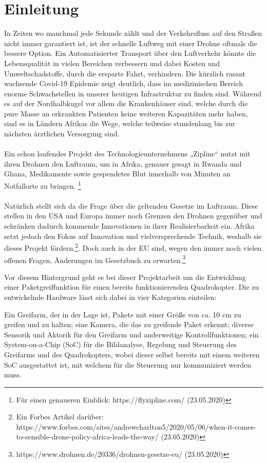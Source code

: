 \chapter{Einleitung}
In Zeiten wo manchmal jede Sekunde zählt und der Verkehrsfluss auf den Straßen nicht immer garantiert ist, ist der schnelle Luftweg mit einer Drohne oftmals die bessere Option. Ein Automatisierter Transport über den Luftverkehr könnte die Lebensqualität in vielen Bereichen verbessern und dabei Kosten und Umweltschadstoffe, durch die ersparte Fahrt, verhindern. Die kürzlich rasant wachsende Covid-19 Epidemie zeigt deutlich, dass im medizinischen Bereich enorme Schwachstellen in unserer heutigen Infrastruktur zu finden sind. Während es auf der Nordhalbkugel vor allem die Krankenhäuser sind, welche durch die pure Masse an erkrankten Patienten keine weiteren Kapazitäten mehr haben, sind es in Ländern Afrikas die Wege, welche teilweise stundenlang bis zur nächsten ärztlichen Versorgung sind.\\
\\
Ein schon laufendes Projekt des Technologieunternehmens „Zipline“ nutzt mit ihren Drohnen den Luftraum, um in Afrika, genauer gesagt in Rwanda und Ghana, Medikamente sowie gespendetes Blut innerhalb von Minuten an Notfallorte zu bringen. \footnote[1]{Für einen genaueren Einblick: https://flyzipline.com/ (23.05.2020)}\\
\\
Natürlich stellt sich da die Frage über die geltenden Gesetze im Luftraum. Diese stellen in den USA und Europa immer noch Grenzen den Drohnen gegenüber und schränken dadurch kommende Innovationen in ihrer Realisierbarkeit ein. Afrika setzt jedoch den Fokus auf Innovation und vielversprechende Technik, weshalb sie dieses Projekt fördern.\footnote[2]{Ein Forbes Artikel darüber: https://www.forbes.com/sites/andrewcharlton5/2020/05/06/when-it-comes-to-sensible-drone-policy-africa-leads-the-way/ (23.05.2020)}. Doch auch in der EU sind, wegen den immer noch vielen offenen Fragen, Änderungen im Gesetzbuch zu erwarten.\footnote[3]{https://www.drohnen.de/20336/drohnen-gesetze-eu/ (23.05.2020)} 

Vor diesem Hintergrund geht es bei dieser Projektarbeit um die Entwicklung einer Paketgreiffunktion für einen
bereits funktionierenden Quadrokopter. Die zu entwickelnde Hardware lässt sich dabei
in vier Kategorien einteilen: 

Ein Greifarm, der in der Lage ist, Pakete mit einer Größe
von ca. 10 cm zu greifen und zu halten; eine Kamera, die das zu greifende Paket
erkennt; diverse Sensorik und Aktorik für den Greifarm und anderweitige
Kontrollfunktionen; ein System-on-a-Chip (SoC) für die Bildanalyse, Regelung und
Steuerung des Greifarms und des Quadrokopters, wobei dieser selbst bereits mit
einem weiteren SoC ausgestattet ist, mit welchem für die Steuerung nur kommuniziert
werden muss.

